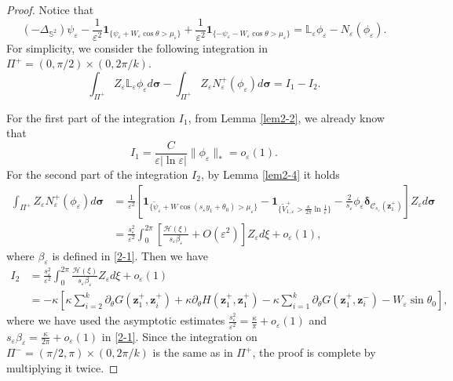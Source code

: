 \documentclass[12pt,reqno]{amsart}
\numberwithin{equation}{section}
\theoremstyle{definition}
\theoremstyle{remark}
\newcommand{\ep}{\varepsilon}
\begin{document}
	\begin{proof}
		Notice that
		\begin{equation*}
			(-\Delta_{\mathbb S^2})\psi_\varepsilon-\frac{1}{\varepsilon^2}\boldsymbol1_{\{\psi_\varepsilon+W_\varepsilon\cos\theta>\mu_\varepsilon\}}+\frac{1}{\varepsilon^2}\boldsymbol1_{\{-\psi_\varepsilon-W_\varepsilon\cos\theta>\mu_\varepsilon\}}=\mathbb L_\varepsilon\phi_\varepsilon-N_\varepsilon(\phi_\varepsilon).
		\end{equation*}
		For simplicity, we consider the following integration in $\Pi^+=(0,\pi/2)\times(0,2\pi/k)$.
		\begin{equation*}
			\int_{\Pi^+}Z_\varepsilon\mathbb L_\varepsilon\phi_\varepsilon d\boldsymbol \sigma-\int_{\Pi^+}Z_\varepsilon N_\varepsilon^+(\phi_\varepsilon)d\boldsymbol \sigma=I_1-I_2.
		\end{equation*}
		
		For the first part of the integration $I_1$, from Lemma \ref{lem2-2}, we already know that 
		$$I_1=\frac{C}{\varepsilon|\ln\varepsilon|}\|\phi_\varepsilon\|_*=o_\varepsilon(1).$$ 
		For the second part of the integration $I_2$, by Lemma \ref{lem2-4} it holds 
			\begin{align*}
			\int_{\Pi^+}Z_\varepsilon N_\varepsilon^+(\phi_\varepsilon)d\boldsymbol \sigma&=\frac{1}{\varepsilon^2}\left[\boldsymbol1_{\{\tilde\psi_\varepsilon+W\cos(s_\varepsilon y_1+\theta_0)>\mu_\varepsilon\}}-\boldsymbol 1_{\{\tilde V_{1,\varepsilon}^+>\frac{\kappa}{2\pi}\ln\frac{1}{\varepsilon}\}}-\frac{2}{s_\varepsilon}\phi_\varepsilon\boldsymbol\delta_{\mathcal C_{s_\varepsilon}(\boldsymbol z_1^+)}\right]Z_\varepsilon d\boldsymbol\sigma\\
			&=\frac{s_\varepsilon^2}{\varepsilon^2}\int_0^{2\pi}\left[\frac{\mathcal H(\xi)}{s_\varepsilon\beta_\varepsilon}+O(\varepsilon^2)\right]Z_\varepsilon d\xi+o_\varepsilon(1),
		\end{align*}
		where $\beta_\ep$ is defined in \eqref{2-1}. Then we have 
		\begin{align*}
			I_2&=\frac{s_\varepsilon^2}{\varepsilon^2}\int_0^{2\pi}\frac{\mathcal H(\xi)}{s_\varepsilon\beta_\varepsilon} Z_\varepsilon d\xi+o_\varepsilon(1)\\
			&=-\kappa\left[\kappa\sum\limits_{i=2}^k\partial_\theta G(\boldsymbol z_1^+,\boldsymbol z_i^+)+ \kappa \partial_\theta H(\boldsymbol z_1^+,\boldsymbol z_1^+)-\kappa\sum\limits_{i=1}^k\partial_\theta G(\boldsymbol z_1^+,\boldsymbol z_i^-)-W_\varepsilon\sin\theta_0\right],
		\end{align*}
		where we have used the asymptotic estimates $\frac{s_\varepsilon^2}{\varepsilon^2}=\frac{\kappa}{\pi}+o_{\varepsilon}(1)$ and $s_\varepsilon\beta_\varepsilon=\frac{\kappa}{2\pi}+o_\varepsilon(1)$ in \eqref{2-1}. 
		Since the integration on $\Pi^-=(\pi/2,\pi)\times(0,2\pi/k)$ is the same as in $\Pi^+$, the proof is complete by multiplying it twice.
	\end{proof}
\end{document}
